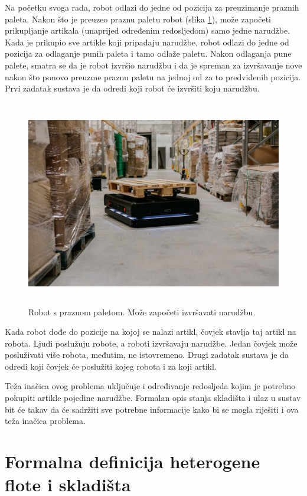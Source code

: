 \documentclass[times, utf8, seminar]{fer}
\begin{document}
Na početku svoga rada, robot odlazi do jedne od pozicija za preuzimanje praznih
paleta. Nakon što je preuzeo praznu paletu robot (slika \ref{fig:robot-02}), može započeti prikupljanje artikala (unaprijed 
određenim redosljedom) samo jedne narudžbe. Kada
je prikupio sve artikle koji pripadaju narudžbe, robot odlazi do jedne od pozicija za odlaganje punih paleta i
tamo odlaže paletu. Nakon odlaganja pune palete, smatra se da je robot izvršio narudžbu i da
je spreman za izvršavanje nove nakon što ponovo preuzme praznu paletu na jednoj od za to predviđenih
pozicija.
Prvi zadatak sustava je da odredi koji robot će izvršiti koju narudžbu.

\begin{figure}[htb]
    \centering
    \includegraphics[height=9cm]{images/robot-02.jpg}
    \caption{Robot s praznom paletom. Može započeti izvršavati narudžbu. \citep{Gideon:PollDebunks}}
    \label{fig:robot-02}
\end{figure}

Kada robot dođe do pozicije na kojoj se nalazi artikl, čovjek stavlja taj artikl na robota.
Ljudi poslužuju robote, a roboti izvršavaju narudžbe. Jedan čovjek može posluživati više robota,
međutim, ne istovremeno. Drugi zadatak sustava je da odredi koji čovjek će poslužiti kojeg robota
i za koji artikl.

Teža inačica ovog problema uključuje i određivanje redosljeda kojim je potrebno pokupiti
artikle pojedine narudžbe. Formalan opis stanja skladišta i ulaz u sustav bit će takav da će
sadržiti sve potrebne informacije kako bi se mogla riješiti i ova teža inačica problema.

\section{Formalna definicija heterogene flote i skladišta}
\end{document}
